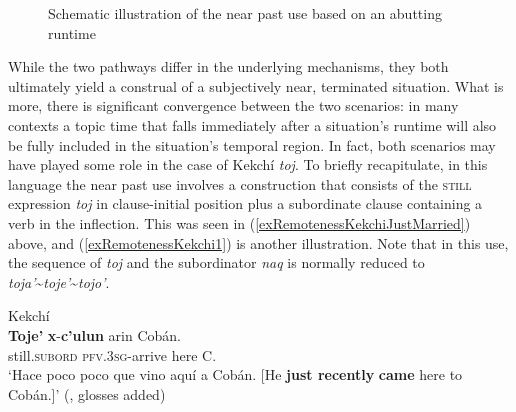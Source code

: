 \begin{figure}[bth]
\begin{subfigure}[b]{0.48\linewidth}
	\end{subfigure}
	\caption{Schematic illustration of the near past use based on an abutting runtime\label{figureNearPast2}}
\end{figure}

While the two pathways differ in the underlying mechanisms, they both ultimately yield a construal of a subjectively near, terminated situation. What is more, there is significant convergence between the two scenarios: in many contexts a topic time that falls immediately after a situation's runtime will also be fully included in the situation's temporal region. In fact, both scenarios may have played some role in the case of Kekchí \textit{toj}. To briefly recapitulate, in this language the near past use involves a construction that consists of the \textsc{still} expression \textit{toj} in clause-initial position plus a subordinate clause containing a verb in the   inflection. This was seen in (\ref{exRemotenessKekchiJustMarried}) above, and (\ref{exRemotenessKekchi1}) is another illustration. Note that in this use, the sequence of \textit{toj} and the subordinator \textit{naq} is normally reduced to \textit{toja\rq}\sim\textit{toje\rq}\sim\textit{tojo\rq}.

\begin{exe}
	\ex Kekchí\label{exRemotenessKekchi1}\\
	\gll \textbf{Toje'} \textbf{x}-\textbf{c’ulun} arin Cobán.\\
	still.\textsc{subord} \textsc{pfv}.3\textsc{sg}-arrive here C.\\
	\glt \lq Hace poco poco que vino aquí a Cobán. [He \textbf{just recently} \textbf{came} here to Cobán.]' (\cite[202]{EachusCarlson1980}, glosses added)\\
\end{exe}

